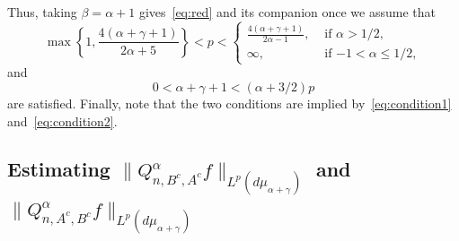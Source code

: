 \documentclass[a4paper]{amsart}
\newcommand{\muag}{d\mu_{\alpha+\gamma}}
\begin{document}
Thus, taking $\beta=\alpha+1$ gives~\eqref{eq:red}
and its companion once we assume that
\begin{equation*}
  \max\left\{1,\frac{4(\alpha+\gamma+1)}{2\alpha+5}\right\}
  < p <
  \begin{cases}\frac{4(\alpha+\gamma+1)}{2\alpha-1},
    &\text{ if $\alpha>1/2$},\\
    \infty,&\text{ if $-1<\alpha\le 1/2$},
  \end{cases}
\end{equation*}
and
\begin{equation*}
  0 < \alpha+\gamma+1 < (\alpha+3/2)p
\end{equation*}
are satisfied. Finally, note that the two conditions
are implied by~\eqref{eq:condition1} and~\eqref{eq:condition2}.

\subsection{Estimating $\|Q^\alpha_{n,B^c,A^c}f\|_{L^p(\muag)}$ and
$\|Q^\alpha_{n,A^c,B^c}f\|_{L^p(\muag)}$}
\end{document}
